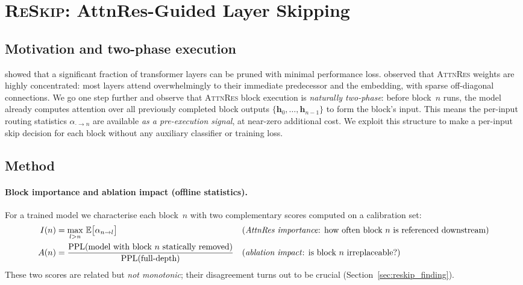 \documentclass{article}
\newcommand{\attnres}{\textsc{AttnRes}}
\newcommand{\reskip}{\textsc{ReSkip}}
\newcommand{\E}{\mathbb{E}}
\begin{document}
\section{\reskip{}: AttnRes-Guided Layer Skipping}
\label{sec:reskip}

\subsection{Motivation and two-phase execution}

\citet{gromov2024unreasonable} showed that a significant fraction of transformer layers can be pruned with minimal performance loss. \citet{chen2026attnres} observed that \attnres{} weights are highly concentrated: most layers attend overwhelmingly to their immediate predecessor and the embedding, with sparse off-diagonal connections. We go one step further and observe that \attnres{} block execution is \emph{naturally two-phase}: before block~$n$ runs, the model already computes attention over all previously completed block outputs $\{\mathbf{h}_0, \ldots, \mathbf{h}_{n-1}\}$ to form the block's input. This means the per-input routing statistics $\alpha_{\cdot \to n}$ are available \emph{as a pre-execution signal}, at near-zero additional cost. We exploit this structure to make a per-input skip decision for each block without any auxiliary classifier or training loss.

\subsection{Method}
\label{sec:reskip_method}

\paragraph{Block importance and ablation impact (offline statistics).}
For a trained model we characterise each block~$n$ with two complementary scores computed on a calibration set:
\begin{align}
    I(n) &= \max_{l > n}\,\E\big[\alpha_{n \to l}\big] && \text{(\emph{AttnRes importance}: how often block $n$ is referenced downstream)} \label{eq:importance}\\
    A(n) &= \frac{\text{PPL}(\text{model with block $n$ statically removed})}{\text{PPL}(\text{full-depth})} && \text{(\emph{ablation impact}: is block $n$ irreplaceable?)} \label{eq:ablation}
\end{align}
These two scores are related but \emph{not monotonic}; their disagreement turns out to be crucial (Section~\ref{sec:reskip_finding}).
\end{document}
